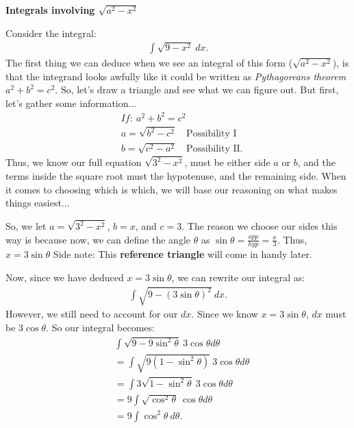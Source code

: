 \documentclass{report}
\begin{document}
    \bigbreak \noindent 
    \begin{large}
        \textbf{Integrals involving $\sqrt{a^{2} -x^{2}}$}
    \end{large}
    \bigbreak \noindent 
    \begin{minipage}[]{0.47\textwidth}
    Consider the integral:
    \begin{align*}
        \int \sqrt{9-x^{2}}\ dx
    .\end{align*}
    \bigbreak \noindent 
    The first thing we can deduce when we see an integral of this form ($\sqrt{a^{2} - x^{2}}$), is that the integrand looks awfully like it could be written as \textit{Pythagoreans theorem} $a^{2} + b^{2} = c^{2}$. So, let's draw a triangle and see what we can figure out. But first, let's gather some information...
    \begin{align*}
        &If:\ a^{2} + b^{2} = c^{2} \\
        &a = \sqrt{b^{2} - c^{2}}\quad \text{Possibility I} \\
        &b = \sqrt{c^{2} - a^{2}}\quad \text{Possibility II}
    .\end{align*}
    Thus, we know our full equation $\sqrt{3^{2}-x^{2}}$, must be either side $a$ or $b$, and the terms inside the square root must the hypotenuse, and the remaining side. When it comes to choosing which is which, we will base our reasoning on what makes things easiest...
    \end{minipage}
    \hspace{0.5in}
    \begin{minipage}[]{0.47\textwidth}
        \bigbreak \noindent 
         So, we let $a=\sqrt{3^{2}-x^{2}}$, $b=x$, and $c=3$. The reason we choose our sides this way is because now, we can define the angle $\theta$ as $\sin{\theta} = \frac{opp}{hyp} = \frac{x}{3}$. Thus, $x = 3\sin{\theta}$
         \bigbreak \noindent 
         Side note: This \textbf{reference triangle} will come in handy later.
    \end{minipage}
    \bigbreak \noindent 
    Now, since we have deduced $x=3\sin{\theta}$, we can rewrite our integral as:
    \begin{align*}
        \int \sqrt{9-(3\sin{\theta })^{2}}\ dx
    .\end{align*}
    \bigbreak \noindent 
    However, we still need to account for our $dx$. Since we know $x=3\sin{\theta}$, $dx$ must be $3\cos{\theta}$. So our integral becomes:
    \begin{align*}
        &\int \sqrt{9-9\sin^{2}{\theta }}\ 3\cos{\theta}d\theta  \\
        &=\int \sqrt{9(1-\sin^{2}{\theta })}\ 3\cos{\theta}d\theta  \\
        &=\int 3\sqrt{1-\sin^{2}{\theta }}\ 3\cos{\theta}d\theta  \\
        &= 9\int \sqrt{\cos^{2}{\theta }}\ \cos{\theta }d\theta  \\
        &=9 \int \cos^{2}{\theta }\ d\theta 
    .\end{align*}
\end{document}
